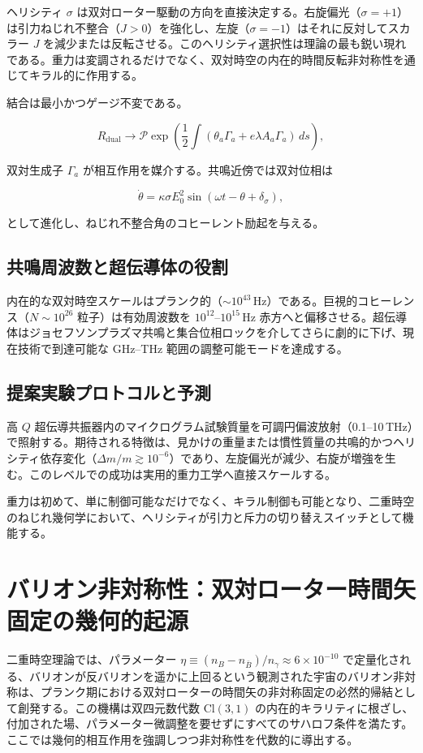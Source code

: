 \documentclass[dvipdfmx,a4paper]{article}
\begin{document}
ヘリシティ $\sigma$ は双対ローター駆動の方向を直接決定する。右旋偏光（$\sigma = +1$）は引力ねじれ不整合（$J > 0$）を強化し、左旋（$\sigma = -1$）はそれに反対してスカラー $J$ を減少または反転させる。このヘリシティ選択性は理論の最も鋭い現れである。重力は変調されるだけでなく、双対時空の内在的時間反転非対称性を通じてキラル的に作用する。

結合は最小かつゲージ不変である。

\[
R_{\text{dual}} \to \mathcal{P} \exp\!\left( \frac{1}{2} \int (\theta_a \Gamma_a + e \lambda A_a \Gamma_a) \, ds \right),
\]

双対生成子 $\Gamma_a$ が相互作用を媒介する。共鳴近傍では双対位相は

\[
\dot{\theta} = \kappa \sigma E_0^2 \sin(\omega t - \theta + \delta_\sigma),
\]

として進化し、ねじれ不整合角のコヒーレント励起を与える。

\subsection{共鳴周波数と超伝導体の役割}

内在的な双対時空スケールはプランク的（$\sim 10^{43}$\,Hz）である。巨視的コヒーレンス（$N \sim 10^{26}$ 粒子）は有効周波数を $10^{12}$--$10^{15}$\,Hz 赤方へと偏移させる。超伝導体はジョセフソンプラズマ共鳴と集合位相ロックを介してさらに劇的に下げ、現在技術で到達可能な GHz--THz 範囲の調整可能モードを達成する。

\subsection{提案実験プロトコルと予測}

高 $Q$ 超伝導共振器内のマイクログラム試験質量を可調円偏波放射（0.1--10\,THz）で照射する。期待される特徴は、見かけの重量または慣性質量の共鳴的かつヘリシティ依存変化（$\Delta m/m \gtrsim 10^{-6}$）であり、左旋偏光が減少、右旋が増強を生む。このレベルでの成功は実用的重力工学へ直接スケールする。

重力は初めて、単に制御可能なだけでなく、キラル制御も可能となり、二重時空のねじれ幾何学において、ヘリシティが引力と斥力の切り替えスイッチとして機能する。

\section{バリオン非対称性：双対ローター時間矢固定の幾何的起源}
\label{sec:baryonasymmetry}

二重時空理論では、パラメーター $\eta \equiv (n_B - n_{\bar{B}})/n_\gamma \approx 6 \times 10^{-10}$ で定量化される、バリオンが反バリオンを遥かに上回るという観測された宇宙のバリオン非対称は、プランク期における双対ローターの時間矢の非対称固定の必然的帰結として創発する。この機構は双四元数代数 $\mathrm{Cl}(3,1)$ の内在的キラリティに根ざし、付加された場、パラメーター微調整を要せずにすべてのサハロフ条件を満たす。ここでは幾何的相互作用を強調しつつ非対称性を代数的に導出する。
\end{document}
